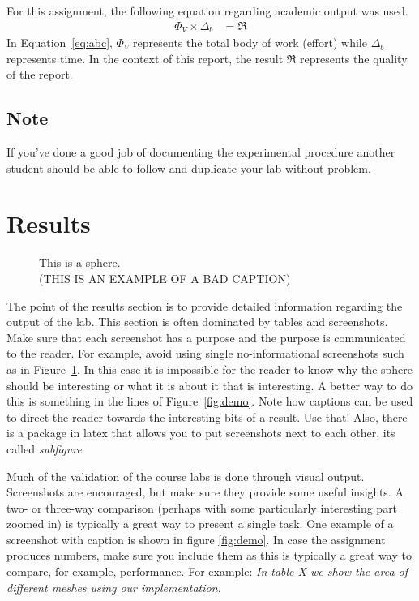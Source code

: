 \documentclass[onecolumn]{article}
\begin{document}
For this assignment, the following equation regarding academic output was used.
\begin{align}
	\Phi_V \times \Delta_b &= \Re \label{eq:abc}
\end{align}
In Equation~\ref{eq:abc}, $\Phi_V$ represents the total body of work (effort) while $\Delta_b$ represents time. In the context of this report, the result $\Re$ represents the quality of the report.

\subsection*{Note} %
If you've done a good job of documenting the experimental procedure another student should be able to follow and duplicate your lab without problem.

\section{Results}

\begin{figure}[t]
\centering
\caption{\label{fig:demo-bad}
This is a sphere.\\(THIS IS AN EXAMPLE OF A BAD CAPTION)}
\end{figure}

The point of the results section is to provide detailed information regarding the output of the lab. This section is often dominated by tables and screenshots. Make sure that each screenshot has a purpose and the purpose is communicated to the reader. For example, avoid using single no-informational screenshots such as in Figure~\ref{fig:demo-bad}. In this case it is impossible for the reader to know why the sphere should be interesting or what it is about it that is interesting. A better way to do this is something in the lines of Figure~\ref{fig:demo}. Note how captions can be used to direct the reader towards the interesting bits of a result. Use that! Also, there is a package in latex that allows you to put screenshots next to each other, its called \emph{subfigure}.

Much of the validation of the course labs is done through visual output. Screenshots are encouraged, but make sure they provide some useful insights. A two- or three-way comparison (perhaps with some particularly interesting part zoomed in) is typically a great way to present a single task. One example of a screenshot with caption is shown in figure \ref{fig:demo}. In case the assignment produces numbers, make sure you include them as this is typically a great way to compare, for example, performance. For example: \emph{In table X we show the area of different meshes using our implementation.}
\end{document}
